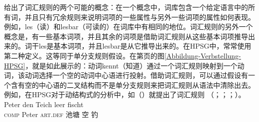  \citet{Jackendoff75a}给出了词汇规则的两个可能的概念：在一个概念中，词库包含一个给定语言中的所有词，并且只有冗余规则来说明词项的一些属性与另外一些词项的属性如何表现。例如，les（读）和lesbar（可读的）在词库中有相同的地位。词汇规则的另外一个概念是，有一些基本词项，并且其余的词项是借助词汇规则从这些基本词项推导出来的。词干les是基本词项，并且lesbar是从它推导出来的。在HPSG中，常常使用第二种定义。这等同于单分支规则假设。在第\pageref{Abbildung-Verbstellung-HPSG}页的图\ref{Abbildung-Verbstellung-HPSG}，就是如此展示的：动词kennt（知道）通过一个词汇规则映射到一个动词，该动词选择一个空的动词中心语进行投射。借助词汇规则，可以通过假设有一个含有空的中心语的二叉结构而不是单分支规则来把词汇规则从语法中清除出去。例如，在HPSG对于动结构式的分析中，如（）就提出了词汇规则 （\citealp{Verspoor97a}；\citealp{Wechsler97a}；\citealp{WN2001a}；\citealp[\S~5]{Mueller2002b}）。
\ea
\gll [dass] Peter den Teich leer fischt\\
	 \spacebr{}\textsc{comp} Peter \textsc{art}.\textsc{def} 池塘 空 钓\\
